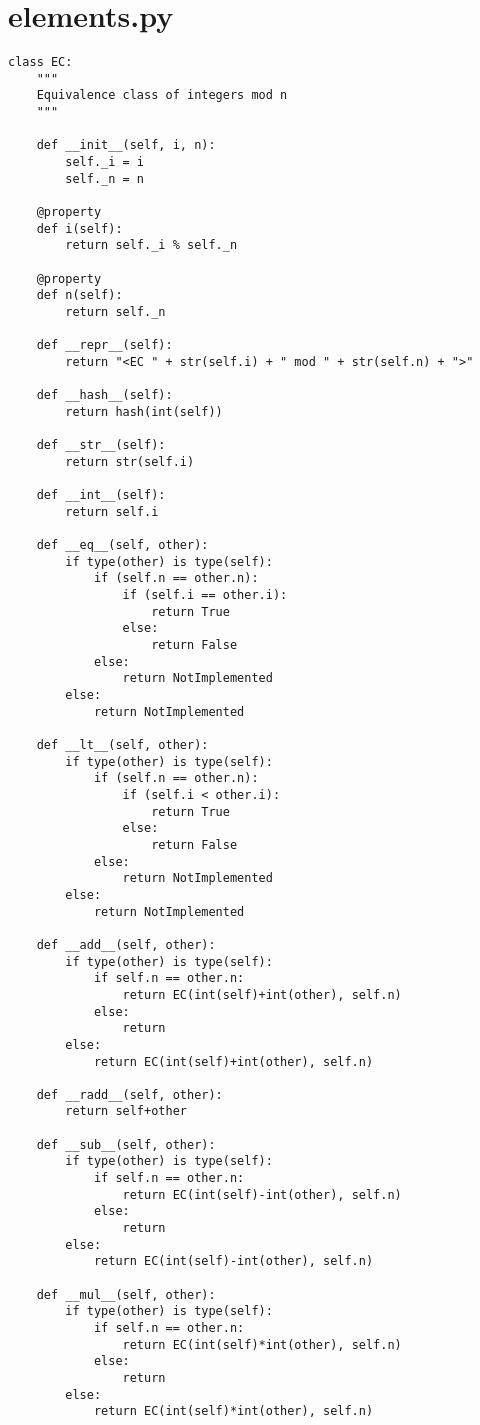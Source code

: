 \documentclass[12pt]{amsart}
\theoremstyle{plain}
\begin{document}
\section{elements.py}
\begin{verbatim}
class EC:
    """
    Equivalence class of integers mod n
    """

    def __init__(self, i, n):
        self._i = i
        self._n = n

    @property
    def i(self):
        return self._i % self._n

    @property
    def n(self):
        return self._n

    def __repr__(self):
        return "<EC " + str(self.i) + " mod " + str(self.n) + ">"

    def __hash__(self):
        return hash(int(self))

    def __str__(self):
        return str(self.i)

    def __int__(self):
        return self.i

    def __eq__(self, other):
        if type(other) is type(self):
            if (self.n == other.n):
                if (self.i == other.i):
                    return True
                else:
                    return False
            else:
                return NotImplemented
        else:
            return NotImplemented

    def __lt__(self, other):
        if type(other) is type(self):
            if (self.n == other.n):
                if (self.i < other.i):
                    return True
                else:
                    return False
            else:
                return NotImplemented
        else:
            return NotImplemented

    def __add__(self, other):
        if type(other) is type(self):
            if self.n == other.n:
                return EC(int(self)+int(other), self.n)
            else:
                return
        else:
            return EC(int(self)+int(other), self.n)

    def __radd__(self, other):
        return self+other

    def __sub__(self, other):
        if type(other) is type(self):
            if self.n == other.n:
                return EC(int(self)-int(other), self.n)
            else:
                return
        else:
            return EC(int(self)-int(other), self.n)

    def __mul__(self, other):
        if type(other) is type(self):
            if self.n == other.n:
                return EC(int(self)*int(other), self.n)
            else:
                return
        else:
            return EC(int(self)*int(other), self.n)


\end{verbatim}
\end{document}
